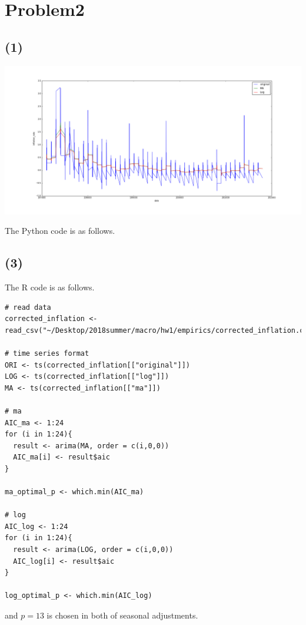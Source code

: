 \documentclass{article}
\begin{document}
\section{Problem2}
\subsection{(1)}
\includegraphics[width = 15cm]{inflation.png}

The Python code is as follows.


\subsection{(3)}
The R code is as follows.
\begin{lstlisting}
# read data
corrected_inflation <- read_csv("~/Desktop/2018summer/macro/hw1/empirics/corrected_inflation.csv")

# time series format
ORI <- ts(corrected_inflation[["original"]])
LOG <- ts(corrected_inflation[["log"]])
MA <- ts(corrected_inflation[["ma"]])

# ma
AIC_ma <- 1:24
for (i in 1:24){
  result <- arima(MA, order = c(i,0,0))
  AIC_ma[i] <- result$aic
}

ma_optimal_p <- which.min(AIC_ma)

# log
AIC_log <- 1:24
for (i in 1:24){
  result <- arima(LOG, order = c(i,0,0))
  AIC_log[i] <- result$aic
}

log_optimal_p <- which.min(AIC_log)
\end{lstlisting}
and $p = 13$ is chosen in both of seasonal adjustments.
\end{document}
